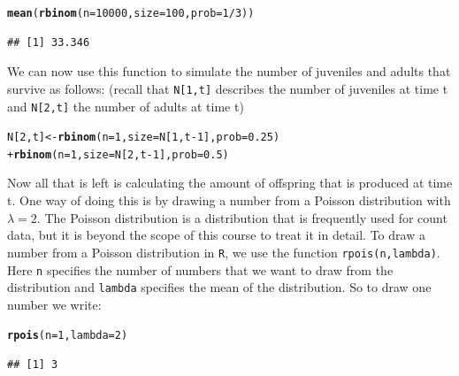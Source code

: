 \documentclass{article}\usepackage[]{graphicx}\usepackage[]{color}
\makeatletter
\newcommand{\hlnum}[1]{\textcolor[rgb]{0.686,0.059,0.569}{#1}}%
\newcommand{\hlopt}[1]{\textcolor[rgb]{0,0,0}{#1}}%
\newcommand{\hlstd}[1]{\textcolor[rgb]{0.345,0.345,0.345}{#1}}%
\newcommand{\hlkwb}[1]{\textcolor[rgb]{0.69,0.353,0.396}{#1}}%
\newcommand{\hlkwc}[1]{\textcolor[rgb]{0.333,0.667,0.333}{#1}}%
\newcommand{\hlkwd}[1]{\textcolor[rgb]{0.737,0.353,0.396}{\textbf{#1}}}%
\newenvironment{kframe}{%
 \def\at@end@of@kframe{}%
 \ifinner\ifhmode%
  \def\at@end@of@kframe{\end{minipage}}%
  \begin{minipage}{\columnwidth}%
 \fi\fi%
 \def\FrameCommand##1{\hskip\@totalleftmargin \hskip-\fboxsep
 \colorbox{shadecolor}{##1}\hskip-\fboxsep
     \hskip-\linewidth \hskip-\@totalleftmargin \hskip\columnwidth}%
 \MakeFramed {\advance\hsize-\width
   \@totalleftmargin\z@ \linewidth\hsize
   \@setminipage}}%
 {\par\unskip\endMakeFramed%
 \at@end@of@kframe}
\newenvironment{knitrout}{}{} %
\makeatother
\begin{document}
\begin{knitrout}
\color{fgcolor}\begin{kframe}
\begin{alltt}
\hlkwd{mean}\hlstd{(}\hlkwd{rbinom}\hlstd{(}\hlkwc{n}\hlstd{=}\hlnum{10000}\hlstd{,}\hlkwc{size}\hlstd{=}\hlnum{100}\hlstd{,}\hlkwc{prob}\hlstd{=}\hlnum{1}\hlopt{/}\hlnum{3}\hlstd{))}
\end{alltt}
\begin{verbatim}
## [1] 33.346
\end{verbatim}
\end{kframe}
\end{knitrout}
We can now use this function to simulate the number of juveniles and adults that survive as follows:
(recall that \texttt{N[1,t]} describes the number of juveniles at time t and \texttt{N[2,t]} the number of adults at time t)
\begin{knitrout}
\color{fgcolor}\begin{kframe}
\begin{alltt}
\hlstd{N[}\hlnum{2}\hlstd{,t]}\hlkwb{<-}\hlkwd{rbinom}\hlstd{(}\hlkwc{n}\hlstd{=}\hlnum{1}\hlstd{,}\hlkwc{size}\hlstd{=N[}\hlnum{1}\hlstd{,t}\hlopt{-}\hlnum{1}\hlstd{],}\hlkwc{prob}\hlstd{=}\hlnum{0.25}\hlstd{)}
        \hlopt{+} \hlkwd{rbinom}\hlstd{(}\hlkwc{n}\hlstd{=}\hlnum{1}\hlstd{,}\hlkwc{size}\hlstd{=N[}\hlnum{2}\hlstd{,t}\hlopt{-}\hlnum{1}\hlstd{],}\hlkwc{prob}\hlstd{=}\hlnum{0.5}\hlstd{)}
\end{alltt}
\end{kframe}
\end{knitrout}
Now all that is left is calculating the amount of offspring that is produced at time t. One way of doing this is by drawing a number from a Poisson distribution with $\lambda=2$. The Poisson distribution is a distribution that is frequently used for count data, but it is beyond the scope of this course to treat it in detail. To draw a number from a Poisson distribution in \texttt{R}, we use the function \texttt{rpois(n,lambda)}. Here \texttt{n} specifies the number of numbers that we want to draw from the distribution and \texttt{lambda} specifies the mean of the distribution. So to draw one number we write:
\begin{knitrout}
\color{fgcolor}\begin{kframe}
\begin{alltt}
\hlkwd{rpois}\hlstd{(}\hlkwc{n}\hlstd{=}\hlnum{1}\hlstd{,}\hlkwc{lambda}\hlstd{=}\hlnum{2}\hlstd{)}
\end{alltt}
\begin{verbatim}
## [1] 3
\end{verbatim}
\end{kframe}
\end{knitrout}
\end{document}

